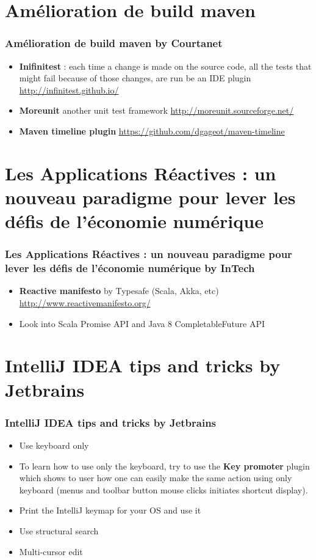 \documentclass[presentation]{beamer}
\begin{document}
\section{Am\'elioration de build maven}

\begin{frame}
\frametitle{Am\'elioration de build maven by Courtanet}

\begin{itemize}
\item \textbf{Inifinitest} : each time a change is made on the source code, all the tests that might fail because of those changes, are run be an IDE plugin
\url{http://infinitest.github.io/}
\item \textbf{Moreunit} another unit test framework
\url{http://moreunit.sourceforge.net/}
\item \textbf{Maven timeline plugin}
\url{https://github.com/dgageot/maven-timeline}
\end{itemize}

\end{frame}

\section{Les Applications R\'eactives : un nouveau paradigme pour lever les d\'efis de l'\'economie num\'erique}

\begin{frame}
\frametitle{Les Applications R\'eactives : un nouveau paradigme pour lever les d\'efis de l'\'economie num\'erique by InTech}

\begin{itemize}
\item \textbf{Reactive manifesto} by Typesafe (Scala, Akka, etc)
\url{http://www.reactivemanifesto.org/}
\item Look into Scala Promise API and Java 8 CompletableFuture API
\end{itemize}

\end{frame}

\section{IntelliJ IDEA tips and tricks by Jetbrains}

\begin{frame}
\frametitle{IntelliJ IDEA tips and tricks by Jetbrains}

\begin{itemize}
\item Use keyboard only
\item To learn how to use only the keyboard, try to use the \textbf{Key promoter} plugin which shows to user how one can easily make the same action using only keyboard (menus and toolbar button mouse clicks initiates shortcut display).
\item Print the IntelliJ keymap for your OS and use it
\item Use structural search
\item Multi-cursor edit
\end{itemize}

\end{frame}
\end{document}
